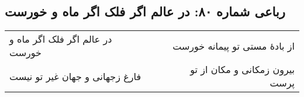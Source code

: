 \begin{center}
\section*{رباعی شماره ۸۰: در عالم اگر فلک اگر ماه و خورست}
\label{sec:sh080}
\begin{longtable}{l p{0.5cm} r}
در عالم اگر فلک اگر ماه و خورست
&&
از بادهٔ مستی تو پیمانه خورست
\\
فارغ زجهانی و جهان غیر تو نیست
&&
بیرون زمکانی و مکان از تو پرست
\\
\end{longtable}
\end{center}
